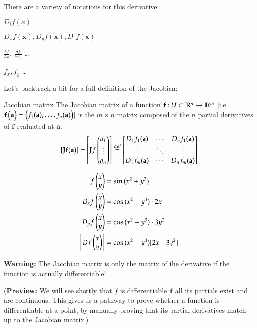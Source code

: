 There are a variety of notations for this derivative:
\begin{itemize}
\begin{minipage}{0.5\linewidth}
  \item $D_i f(x)$
  \item $D_x f(\bm{x}), D_y f(\bm{x}), D_z f(\bm{x})$
\end{minipage}\begin{minipage}{0.5\linewidth}
  \item $\frac{\delta f}{\delta x}$, $\frac{\delta f}{\delta x_2}$ \dots
  \item $f_x, f_y$ \dots
  \end{minipage}
\end{itemize}

Let's backtrack a bit for a full definition of the Jacobian: 
\begin{defn}{Jacobian matrix}
	The \ul{Jacobian matrix} of a function $\textbf{f} : U\subset \mathbb{R}^n\to \mathbb{R}^m$ [i.e. $\textbf{f}\begin{pmatrix} \textbf{a} \end{pmatrix} = \begin{pmatrix} f_1(\textbf{a}),\dots,f_n(\textbf{a}) \end{pmatrix}$] is the $m \times n$ matrix composed of the $n$ partial derivatives of $\bm{f}$ evaluated at $\bm{a}$: 
	\[[\textbf{Jf}(\textbf{a})] = \begin{bmatrix} \textbf{J}f\begin{pmatrix} a_1 \\ \vdots \\ a_n \end{pmatrix} \end{bmatrix} \overset{\mathrm{def}}{=} \begin{bmatrix} D_1f_1(\textbf{a}) & \cdots & D_nf_1(\textbf{a}) \\ \ \vdots & \ddots & \vdots \\ D_1f_m(\textbf{a}) & \cdots & D_nf_m(\textbf{a}) \end{bmatrix}\]
\end{defn}


\example
\begin{align*}
  f\begin{pmatrix} x \\ y \end{pmatrix} &= \sin{(x^2+y^3)} \\
  D_x f\begin{pmatrix} x \\ y \end{pmatrix} &= \cos{(x^2 + y^3)}\cdot 2x \\
  D_y f\begin{pmatrix} x \\ y \end{pmatrix} &= \cos{(x^2 + y^3)}\cdot 3y^2 \\
  \left[Df\begin{pmatrix} x \\ y \end{pmatrix}\right] &= \cos{(x^2 + y^3) [2x \quad 3y^2]}
\end{align*}

\textbf{Warning:} The Jacobian matrix is only the matrix of the derivative if the function is actually differentiable!

(\textbf{Preview:} We will see shortly that $f$ is differentiable if all its partials exist and are continuous. This gives us a pathway to prove whether a function is differentiable at a point, by manually proving that its partial derivatives match up to the Jacobian matrix.)

